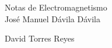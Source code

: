 
\begingroup
\thispagestyle{empty}
\centering
\vspace*{9cm}
\par\normalfont\fontsize{35}{35}\sffamily\selectfont
Notas de Electromagnetismo\\%
\vspace*{1cm}
{\Huge Jos\'e Manuel D\'avila D\'avila}\par %
\vspace*{1cm}
{\Huge David Torres Reyes}\par %
\endgroup
